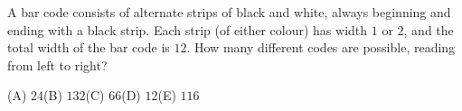 A bar code consists of alternate strips of black and white, always beginning and ending with a black strip. Each strip (of either colour) has width $1$ or $2$, and the total width of the bar code is $12$. How many different codes are possible, reading from left to right?

(A) $24$\quad (B) $132$\quad (C) $66$\quad (D) $12$\quad (E) $116$
